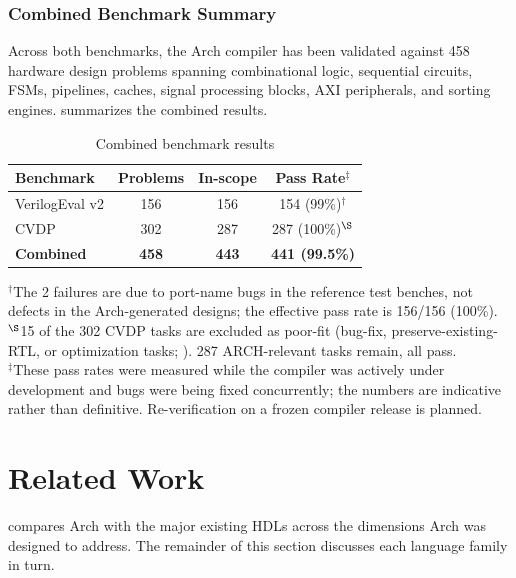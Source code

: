 \documentclass[manuscript]{acmart}
\begin{document}
\subsubsection{Combined Benchmark Summary}

Across both benchmarks, the Arch compiler has been validated against 458 hardware design problems spanning combinational logic, sequential circuits, FSMs, pipelines, caches, signal processing blocks, AXI peripherals, and sorting engines.  summarizes the combined results.

\begin{table}[H]
\centering
\caption{Combined benchmark results}
\label{tab:combined}
\footnotesize
\begin{tabular}{@{}lccc@{}}
\toprule
\textbf{Benchmark} & \textbf{Problems} & \textbf{In-scope} & \textbf{Pass Rate}$^\ddagger$ \\
\midrule
VerilogEval v2 & 156 & 156 & 154 (99\%)$^\dagger$ \\
CVDP & 302 & 287 & 287 (100\%)$^\S$ \\
\midrule
\textbf{Combined} & \textbf{458} & \textbf{443} & \textbf{441 (99.5\%)} \\
\bottomrule
\end{tabular}

\vspace{0.5em}
\raggedright\footnotesize
$^\dagger$The 2 failures are due to port-name bugs in the reference test benches, not defects in the Arch-generated designs; the effective pass rate is 156/156 (100\%).\\
$^\S$15 of the 302 CVDP tasks are excluded as poor-fit (bug-fix, preserve-existing-RTL, or optimization tasks; ). 287 ARCH-relevant tasks remain, all pass.\\
$^\ddagger$These pass rates were measured while the compiler was actively under development and bugs were being fixed concurrently; the numbers are indicative rather than definitive. Re-verification on a frozen compiler release is planned.
\end{table}

\section{Related Work}\label{sec:related}

 compares Arch with the major existing HDLs across the dimensions Arch was designed to address. The remainder of this section discusses each language family in turn.
\end{document}
